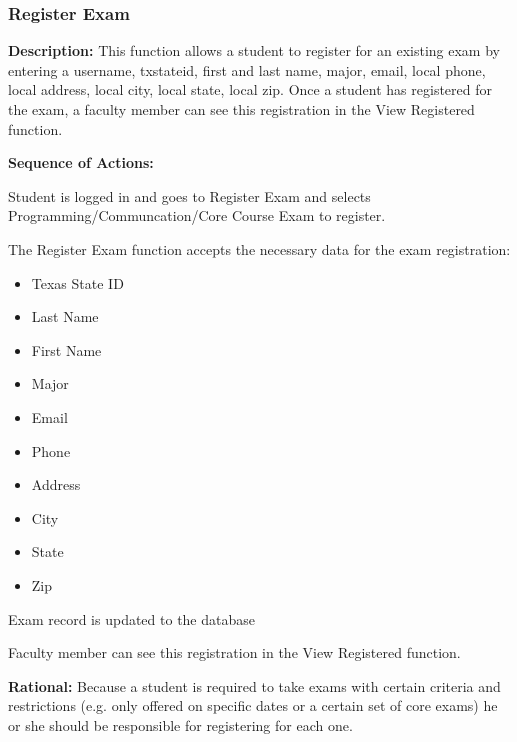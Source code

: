 \subsubsection{\large Register Exam} 
\begin{boxed} %
   \textbf{Description:}
   {\small This function allows a student to register for an existing exam by
         entering a username, txstateid, first and last name, major, email,
         local phone, local address, local city, local state, local zip.
         Once a student has registered for the exam, a faculty member can see
         this registration in the View Registered function.}
         
         \textbf{Sequence of Actions:}
         \begin{enumerate}
               {\small
            \item Student is logged in and goes to Register Exam and selects
               Programming/Communcation/Core Course Exam to register.
            \item The Register Exam function accepts the necessary data for the exam
               registration:
               \begin{itemize}
                  \item Texas State ID
                  \item Last Name
                  \item First Name
                  \item Major
                  \item Email
                  \item Phone
                  \item Address
                  \item City
                  \item State
                  \item Zip
               \end{itemize}
            \item Exam record is updated to the database
            \item Faculty member can see this registration in the View Registered
               function.}
         \end{enumerate}

         \textbf{Rational:}
         {\small Because a student is required to take exams with certain criteria and
         restrictions (e.g. only offered on specific dates or a certain set of
         core exams) he or she should be responsible for registering for each
      one.}
   \end{boxed} %

